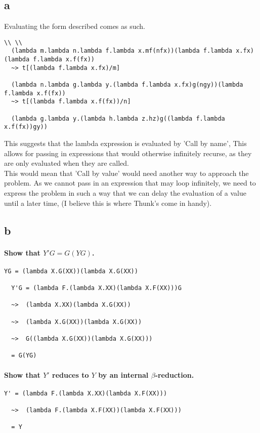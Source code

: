 \documentclass{article}
\begin{document}
\subsection*{a}
Evaluating the form described comes as such.
\begin{lstlisting}[language=Lambda] \\ \\
  (lambda m.lambda n.lambda f.lambda x.mf(nfx))(lambda f.lambda x.fx)(lambda f.lambda x.f(fx))
  ~> t[(lambda f.lambda x.fx)/m]

  (lambda n.lambda g.lambda y.(lambda f.lambda x.fx)g(ngy))(lambda f.lambda x.f(fx))
  ~> t[(lambda f.lambda x.f(fx))/n]

  (lambda g.lambda y.(lambda h.lambda z.hz)g((lambda f.lambda x.f(fx))gy))
\end{lstlisting}

This suggests that the lambda expression is evaluated by 'Call by name', This
allows for passing in expressions that would otherwise infinitely recurse, as
they are only evaluated when they are called. \\

This would mean that 'Call by value' would need another way to approach the
problem. As we cannot pass in an expression that may loop infinitely, we need to
express the problem in such a way that we can delay the evaluation of a value
until a later time, (I believe this is where Thunk's come in handy).

\subsection*{b}
\paragraph{Show that $Y'G = G(YG)$.}
\begin{lstlisting}[language=Lambda]
  YG = (lambda X.G(XX))(lambda X.G(XX))

  Y'G = (lambda F.(lambda X.XX)(lambda X.F(XX)))G

  ~>  (lambda X.XX)(lambda X.G(XX))

  ~>  (lambda X.G(XX))(lambda X.G(XX))

  ~>  G((lambda X.G(XX))(lambda X.G(XX)))

  = G(YG)
\end{lstlisting}

\paragraph{Show that $Y'$ reduces to $Y$ by an internal $\beta$-reduction.}
\begin{lstlisting}[language=Lambda]
  Y' = (lambda F.(lambda X.XX)(lambda X.F(XX)))

  ~>  (lambda F.(lambda X.F(XX))(lambda X.F(XX)))

  = Y
\end{lstlisting}
\end{document}
